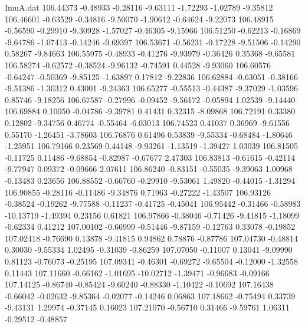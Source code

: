 \begin{filecontents}{ImuA.dat}
 106.44373   -0.48933   -0.28116   -9.63111   -1.72293   -1.02789   -9.35812
 106.46601   -0.63529   -0.34816   -9.50070   -1.90612   -0.64624   -9.22073
 106.48915   -0.56590   -0.29910   -9.30928   -1.57027   -0.46305   -9.15966
 106.51250   -0.62213   -0.16869   -9.64786   -1.07413   -0.14246   -9.69397
 106.53671   -0.56231   -0.17228   -9.51506   -0.14290    0.58267   -9.84663
 106.55975   -0.48933   -0.41276   -9.93979   -0.36426    0.35368   -9.65581
 106.58274   -0.62572   -0.38524   -9.96132   -0.74591    0.44528   -9.93060
 106.60576   -0.64247   -0.50369   -9.85125   -1.63897    0.17812   -9.22836
 106.62884   -0.63051   -0.38166   -9.51386   -1.30312    0.43001   -9.24363
 106.65277   -0.55513   -0.44387   -9.37029   -1.03596    0.85746   -9.18256
 106.67587   -0.27996   -0.09452   -9.56172   -0.05894    1.02539   -9.14440
 106.69884    0.10050   -0.04786   -9.39781    0.41431    0.32315   -8.09868
 106.72191    0.33380    0.12802   -9.34756    0.46774   -0.55464   -6.03013
 106.74523    0.41037    0.36969   -9.61556    0.55170   -1.26451   -3.78603
 106.76876    0.61496    0.53839   -9.55334   -0.68484   -1.80646   -1.25951
 106.79166    0.23569    0.44148   -9.93261   -1.13519   -1.39427    1.03039
 106.81505   -0.11725    0.11486   -9.68854   -0.82987   -0.67677    2.47303
 106.83813   -0.61615   -0.42114   -9.77947    0.09372   -0.09666    2.07611
 106.86240   -0.83151   -0.55035   -9.39063    1.00968   -0.13483    0.23656
 106.88552   -0.66760   -0.29910   -9.53061    1.49820   -0.44015   -1.31294
 106.90855   -0.28116   -0.11486   -9.34876    0.71963   -0.27222   -1.43507
 106.93126   -0.38524   -0.19262   -9.77588   -0.11237   -0.41725   -0.45041
 106.95442   -0.31466   -0.58983  -10.13719   -1.49394    0.23156    0.61821
 106.97866   -0.38046   -0.71426   -9.41815   -1.18099   -0.62334    0.41212
 107.00102   -0.66999   -0.51446   -9.87159   -0.12763    0.33078   -0.19852
 107.02418   -0.76690    0.13878   -9.41815    0.94862    0.78876   -0.87786
 107.04730   -0.48814    0.30030   -9.55334    1.02495   -0.31039   -0.86259
 107.07050   -0.11007    0.13041   -9.09990    0.81123   -0.76073   -0.25195
 107.09341   -0.46301   -0.69272   -9.65504   -0.12000   -1.32558    0.11443
 107.11660   -0.66162   -1.01695  -10.02712   -1.39471   -0.96683   -0.09166
 107.14125   -0.86740   -0.85424   -9.60240   -0.88330   -1.10422   -0.10692
 107.16438   -0.66042   -0.02632   -9.85364   -0.02077   -0.14246    0.06863
 107.18662   -0.75494    0.33739   -9.43131    1.29974   -0.37145    0.16023
 107.21070   -0.56710    0.31466   -9.59761    1.06311   -0.29512   -0.48857

\end{filecontents}
